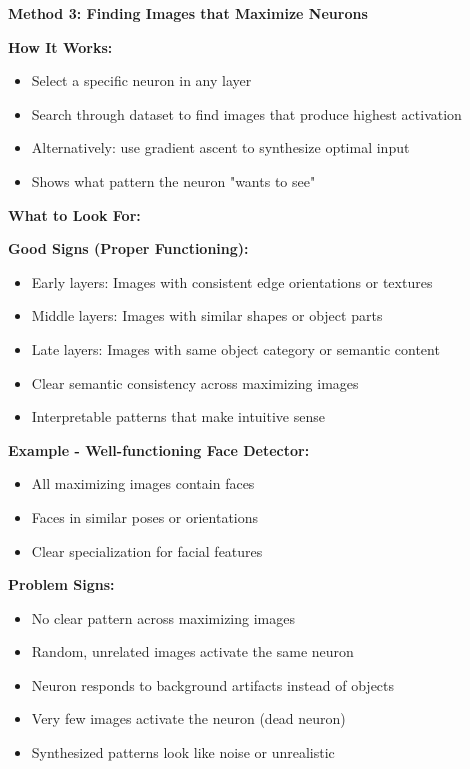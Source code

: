 \documentclass[12pt]{article}
\newcommand{\explanation}[1]{{\color{explanationcolor}#1}}
\begin{document}
\begin{enumerate}[(a)]
{    \textbf{Method 3: Finding Images that Maximize Neurons}
    
    \explanation{
    \textbf{How It Works:}
    \begin{itemize}
        \item Select a specific neuron in any layer
        \item Search through dataset to find images that produce highest activation
        \item Alternatively: use gradient ascent to synthesize optimal input
        \item Shows what pattern the neuron "wants to see"
    \end{itemize}
    
    \textbf{What to Look For:}
    
    \textbf{Good Signs (Proper Functioning):}
    \begin{itemize}
        \item Early layers: Images with consistent edge orientations or textures
        \item Middle layers: Images with similar shapes or object parts
        \item Late layers: Images with same object category or semantic content
        \item Clear semantic consistency across maximizing images
        \item Interpretable patterns that make intuitive sense
    \end{itemize}
    
    \textbf{Example - Well-functioning Face Detector:}
    \begin{itemize}
        \item All maximizing images contain faces
        \item Faces in similar poses or orientations
        \item Clear specialization for facial features
    \end{itemize}
    
    \textbf{Problem Signs:}
    \begin{itemize}
        \item No clear pattern across maximizing images
        \item Random, unrelated images activate the same neuron
        \item Neuron responds to background artifacts instead of objects
        \item Very few images activate the neuron (dead neuron)
        \item Synthesized patterns look like noise or unrealistic
    \end{itemize}
    
}}
\end{enumerate}
\end{document}
